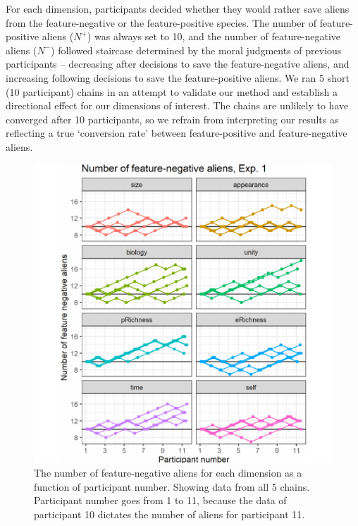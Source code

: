\documentclass[10pt, letterpaper]{article}
\newenvironment{CodeChunk}{}{}
\begin{document}
For each dimension, participants decided whether they would rather save
aliens from the feature-negative or the feature-positive species. The
number of feature-positive aliens (\(N^+\)) was always set to 10, and
the number of feature-negative aliens (\(N^-\)) followed staircase
determined by the moral judgments of previous participants -- decreasing
after decisions to save the feature-negative aliens, and increasing
following decisions to save the feature-positive aliens. We ran 5 short
(10 participant) chains in an attempt to validate our method and
establish a directional effect for our dimensions of interest. The
chains are unlikely to have converged after 10 participants, so we
refrain from interpreting our results as reflecting a true `conversion
rate' between feature-positive and feature-negative aliens.

\begin{CodeChunk}
\begin{figure}[H]

{\centering \includegraphics{figs/mwjplot1-1} 

}

\caption[The number of feature-negative aliens for each dimension as a function of participant number]{The number of feature-negative aliens for each dimension as a function of participant number. Showing data from all 5 chains. Participant number goes from 1 to 11, because the data of participant 10 dictates the number of aliens for participant 11.}\label{fig:mwjplot1}
\end{figure}
\end{CodeChunk}
\end{document}
